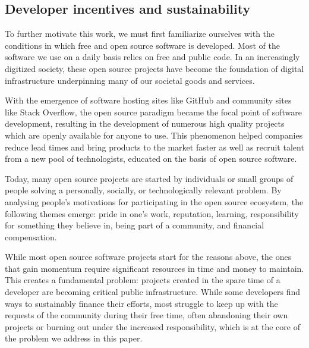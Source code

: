 \subsection{Developer incentives and sustainability}
\label{s:incentives}

To further motivate this work, we must first familiarize ourselves with the
conditions in which free and open source software is developed. Most of the
software we use on a daily basis relies on free and public code. In an
increasingly digitized society, these open source projects have become the
foundation of digital infrastructure underpinning many of our societal goods
and services.

With the emergence of software hosting sites like GitHub and community sites
like Stack Overflow, the open source paradigm became the focal point of
software development, resulting in the development of numerous high quality
projects which are openly available for anyone to use. This phenomenon helped
companies reduce lead times and bring products to the market faster as well as
recruit talent from a new pool of technologists, educated on the basis of
open source software.

Today, many open source projects are started by individuals or small groups of
people solving a personally, socially, or technologically relevant problem. By
analysing people's motivations for participating in the open source ecosystem,
the following themes emerge: pride in one's work, reputation, learning,
responsibility for something they believe in, being part of a community, and
financial compensation.

While most open source software projects start for the reasons above, the ones
that gain momentum require significant resources in time and money to maintain.
This creates a fundamental problem: projects created in the spare time of a
developer are becoming critical public infrastructure. While some developers
find ways to sustainably finance their efforts, most struggle to keep up with
the requests of the community during their free time, often abandoning their
own projects or burning out under the increased responsibility,  which is at
the core of the problem we address in this paper.


